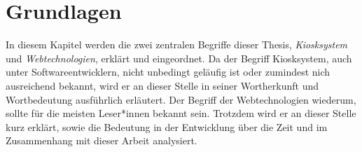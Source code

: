 \chapter{Grundlagen}
\label{chap:grundlagen}

In diesem Kapitel werden die zwei zentralen Begriffe dieser Thesis, \emph{Kiosksystem} und
\emph{Webtechnologien}, erklärt und eingeordnet. Da der Begriff
Kiosksystem, auch unter Softwareentwicklern, nicht unbedingt geläufig ist oder
zumindest nich ausreichend bekannt, wird er an dieser Stelle in seiner Wortherkunft
und Wortbedeutung ausführlich erläutert. Der Begriff der Webtechnologien wiederum, sollte
für die meisten Leser*innen bekannt sein. Trotzdem wird er an dieser Stelle kurz erklärt, sowie
die Bedeutung in der Entwicklung über die Zeit und im Zusammenhang mit dieser Arbeit
analysiert.


